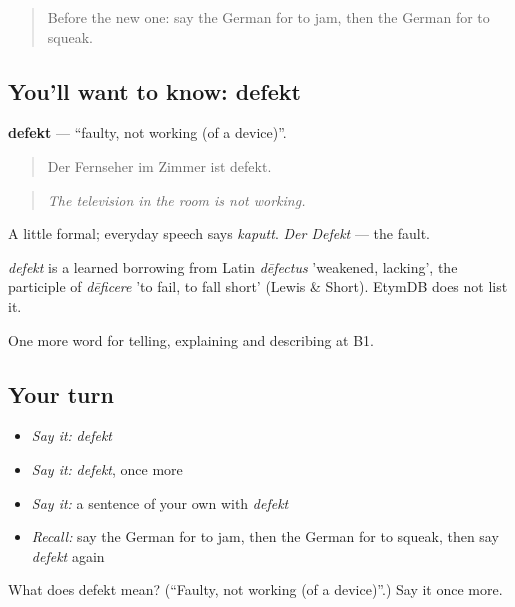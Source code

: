 \label{lesson:GE-C429-defekt}



\begin{quote}
Before the new one: say the German for to jam, then the German for to squeak.
\end{quote}

\subsection*{You'll want to know: defekt}
\textbf{defekt} — \textquotedblleft{}faulty, not working (of a device)\textquotedblright{}.

\begin{quote}
Der Fernseher im Zimmer ist defekt.
\end{quote}

\begin{quote}
\emph{The television in the room is not working.}
\end{quote}

A little formal; everyday speech says \emph{kaputt}. \emph{Der Defekt} — the fault.

\begin{cousinweb}
\emph{defekt} is a learned borrowing from Latin \emph{dēfectus} 'weakened, lacking', the participle of \emph{dēficere} 'to fail, to fall short' (Lewis \& Short). EtymDB does not list it.
\end{cousinweb}

\begin{grammarlens}[title={What you've built}]
One more word for telling, explaining and describing at B1.
\end{grammarlens}

\subsection*{Your turn}
\begin{itemize}
\raggedright
  \item \emph{Say it:} \emph{defekt}
  \item \emph{Say it:} \emph{defekt}, once more
  \item \emph{Say it:} a sentence of your own with \emph{defekt}
  \item \emph{Recall:} say the German for to jam, then the German for to squeak, then say \emph{defekt} again
\end{itemize}

\begin{tcolorbox}[breakable,colback=teal!4,colframe=teal!35!black,title={Before you move on}]
What does defekt mean? (\textquotedblleft{}Faulty, not working (of a device)\textquotedblright{}.) Say it once more.
\end{tcolorbox}
